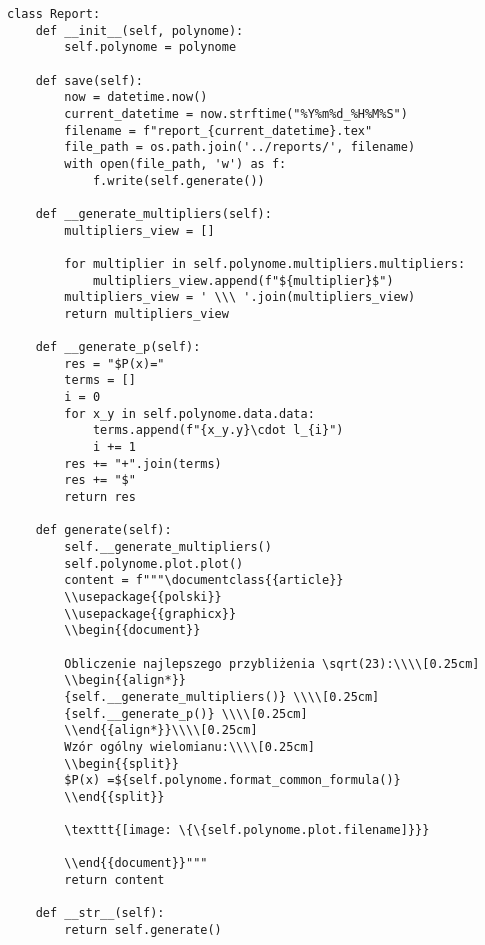 \documentclass[12pt]{article}
\begin{document}
\begin{lstlisting}[frame=single]
class Report:
    def __init__(self, polynome):
        self.polynome = polynome

    def save(self):
        now = datetime.now()
        current_datetime = now.strftime("%Y%m%d_%H%M%S")
        filename = f"report_{current_datetime}.tex"
        file_path = os.path.join('../reports/', filename)
        with open(file_path, 'w') as f:
            f.write(self.generate())

    def __generate_multipliers(self):
        multipliers_view = []

        for multiplier in self.polynome.multipliers.multipliers:
            multipliers_view.append(f"${multiplier}$")
        multipliers_view = ' \\\ '.join(multipliers_view)
        return multipliers_view

    def __generate_p(self):
        res = "$P(x)="
        terms = []
        i = 0
        for x_y in self.polynome.data.data:
            terms.append(f"{x_y.y}\cdot l_{i}")
            i += 1
        res += "+".join(terms)
        res += "$"
        return res

    def generate(self):
        self.__generate_multipliers()
        self.polynome.plot.plot()
        content = f"""\documentclass{{article}}
        \\usepackage{{polski}}
        \\usepackage{{graphicx}}
        \\begin{{document}}
        
        Obliczenie najlepszego przybliżenia \sqrt(23):\\\\[0.25cm]
        \\begin{{align*}}
        {self.__generate_multipliers()} \\\\[0.25cm]
        {self.__generate_p()} \\\\[0.25cm]
        \\end{{align*}}\\\\[0.25cm]
        Wzór ogólny wielomianu:\\\\[0.25cm]
        \\begin{{split}}
        $P(x) =${self.polynome.format_common_formula()}
        \\end{{split}}
        
        \texttt{[image: \{\{self.polynome.plot.filename]}}}
        
        \\end{{document}}"""
        return content

    def __str__(self):
        return self.generate()
\end{lstlisting}
\end{document}
